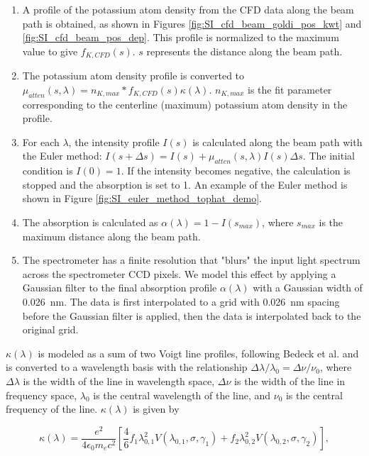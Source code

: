 \begin{enumerate}
    \item A profile of the potassium atom density from the CFD data along the beam path is obtained, as shown in Figures \ref{fig:SI_cfd_beam_goldi_pos_kwt} and \ref{fig:SI_cfd_beam_pos_dep}. This profile is normalized to the maximum value to give $f_{K, CFD} (s)$. $s$ represents the distance along the beam path.
    \item The potassium atom density profile is converted to $\mu_{atten} (s, \lambda) = n_{K,max}* f_{K, CFD} (s) \kappa(\lambda)$. $n_{K,max}$ is the fit parameter corresponding to the centerline (maximum) potassium atom density in the profile.
    \item For each $\lambda$, the intensity profile $I(s)$ is calculated along the beam path with the Euler method: $I(s + \Delta s) = I(s) + \mu_{atten}(s, \lambda) I(s) \Delta s$. The initial condition is $I(0) = 1$. If the intensity becomes negative, the calculation is stopped and the absorption is set to 1. An example of the Euler method is shown in Figure \ref{fig:SI_euler_method_tophat_demo}.
    \item The absorption is calculated as $\alpha(\lambda) = 1 - I(s_{max})$, where $s_{max}$ is the maximum distance along the beam path. 
    \item The spectrometer has a finite resolution that "blurs" the input light spectrum across the spectrometer CCD pixels. We model this effect by applying a Gaussian filter to the final absorption profile $\alpha(\lambda)$ with a Gaussian width of \SI{0.026} {\nano\meter}. The data is first interpolated to a grid with \SI{0.026} {\nano\meter} spacing before the Gaussian filter is applied, then the data is interpolated back to the original grid.
\end{enumerate}

$\kappa(\lambda)$ is modeled as a sum of two Voigt line profiles, following Bedeck et al. \cite{bedickDeterminationElectricalConductivity2019} and is converted to a wavelength basis with the relationship $\Delta \lambda/\lambda_0 = \Delta \nu/\nu_0$, where $\Delta \lambda$ is the width of the line in wavelength space, $\Delta \nu$ is the width of the line in frequency space, $\lambda_0$ is the central wavelength of the line, and $\nu_0$ is the central frequency of the line. $\kappa(\lambda)$ is given by %

\begin{equation}
    \label{eq:cross_section_alpha_fit}
    \kappa(\lambda) = \frac{e^2}{4 \epsilon_0 m_e c^2} \left[ \frac{4}{6} f_1 \lambda_{0,1}^2 V(\lambda_{0,1},\sigma,\gamma_1) + f_2 \lambda_{0,2}^2 V(\lambda_{0,2},\sigma,\gamma_2) \right],
\end{equation}

